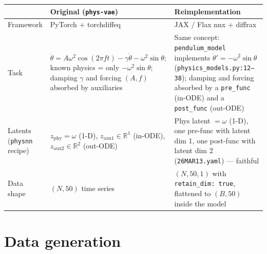 \documentclass[11pt,a4paper]{article}
\newcommand{\code}[1]{\texttt{#1}}
\begin{document}
\begin{table}[h]
\centering
\small
\begin{tabularx}{\textwidth}{LXX}
\toprule
 & \textbf{Original (\code{phys-vae})} & \textbf{Reimplementation} \\
\midrule
Framework & PyTorch + torchdiffeq & JAX / Flax nnx + diffrax \\
Task & $\ddot\theta = A\omega^2\cos(2\pi f t) - \gamma\dot\theta - \omega^2\sin\theta$; known physics = only $-\omega^2\sin\theta$; damping $\gamma$ and forcing $(A, f)$ absorbed by auxiliaries & Same concept: \code{pendulum\_model} implements $\dot\theta' = -\omega^2\sin\theta$ (\code{physics\_models.py:12--38}); damping and forcing absorbed by a \code{pre\_func} (in-ODE) and a \code{post\_func} (out-ODE) \\
Latents (\code{physnn} recipe) & $z_\mathrm{phy} = \omega$ (1-D), $z_{\mathrm{aux1}} \in \mathbb{R}^1$ (in-ODE), $z_{\mathrm{aux2}} \in \mathbb{R}^2$ (out-ODE) & Phys latent $=\omega$ (1-D), one pre-func with latent dim 1, one post-func with latent dim 2 (\code{26MAR13.yaml}) --- faithful \\
Data shape & $(N, 50)$ time series & $(N, 50, 1)$ with \code{retain\_dim: true}, flattened to $(B, 50)$ inside the model \\
\bottomrule
\end{tabularx}
\end{table}

\section{Data generation}
\label{sec:data}
\end{document}
